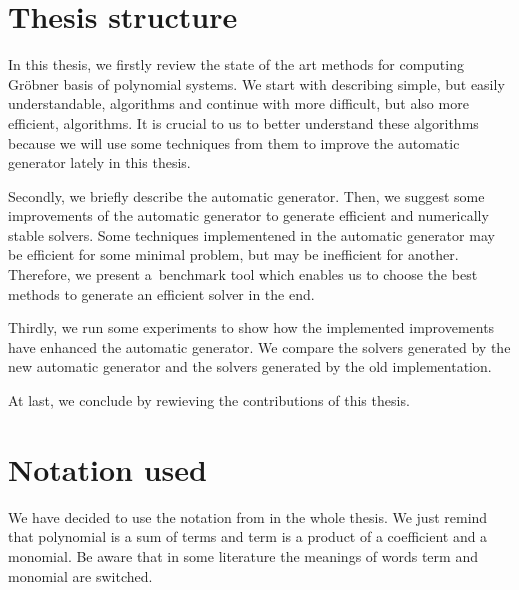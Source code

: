 \section{Thesis structure}
In this thesis, we firstly review the state of the art methods for computing Gr\"obner basis of polynomial systems. We start with describing simple, but easily understandable, algorithms and continue with more difficult, but also more efficient, algorithms. It is crucial to us to better understand these algorithms because we will use some techniques from them to improve the automatic generator lately in this thesis.

Secondly, we briefly describe the automatic generator. Then, we suggest some improvements of the automatic generator to generate efficient and numerically stable solvers. Some techniques implementened in the automatic generator may be efficient for some minimal problem, but may be inefficient for another. Therefore, we present a~benchmark tool which enables us to choose the best methods to generate an efficient solver in the end.

Thirdly, we run some experiments to show how the implemented improvements have enhanced the automatic generator. We compare the solvers generated by the new automatic generator and the solvers generated by the old implementation.

At last, we conclude by rewieving the contributions of this thesis.

\section{Notation used}
We have decided to use the notation from \cite{Cox-Little-Shea97} in the whole thesis. We just remind that polynomial is a sum of terms and term is a product of a coefficient and a monomial. Be aware that in some literature \cite{Becker93, F4, F5} the meanings of words term and monomial are switched.

